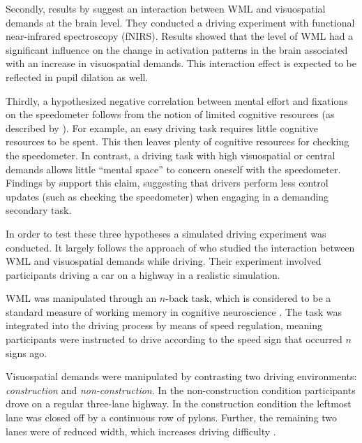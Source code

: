 Secondly, results by \citet{Scheunemann2019} suggest an interaction between WML and visuospatial demands at the brain level. 
They conducted a driving experiment with functional near-infrared spectroscopy (fNIRS).
Results showed that the level of WML had a significant influence on the change in activation patterns in the brain associated with an increase in visuospatial demands.
This interaction effect is expected to be reflected in pupil dilation as well.

Thirdly, a hypothesized negative correlation between mental effort and fixations on the speedometer follows from the notion of limited cognitive resources (as described by \citet{DeWaard1996}).
For example, an easy driving task requires little cognitive resources to be spent.
This then leaves plenty of cognitive resources for checking the speedometer.
In contrast, a driving task with high visuospatial or central demands allows little ``mental space'' to concern oneself with the speedometer.
Findings by \citet{Salvucci2011} support this claim, suggesting that drivers perform less control updates (such as checking the speedometer) when engaging in a demanding secondary task.

In order to test these three hypotheses a simulated driving experiment was conducted.
It largely follows the approach of \citet{Scheunemann2019} who studied the interaction between WML and visuospatial demands while driving.
Their experiment involved participants driving a car on a highway in a realistic simulation. 

WML was manipulated through an \(n\)-back task, which is considered to be a standard measure of working memory in cognitive neuroscience \citep{Kane2007}.
The task was integrated into the driving process by means of speed regulation, meaning participants were instructed to drive according to the speed sign that occurred \(n\) signs ago.

Visuospatial demands were manipulated by contrasting two driving environments: \textit{construction} and \textit{non-construction}.
In the non-construction condition participants drove on a regular three-lane highway.
In the construction condition the leftmost lane was closed off by a continuous row of pylons.
Further, the remaining two lanes were of reduced width, which increases driving difficulty \citep{Liu2016}.